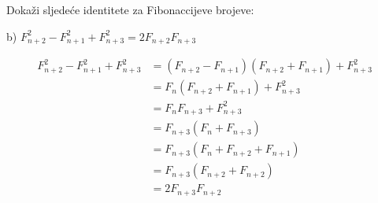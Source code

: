 \documentclass[exam.tex]{subfiles}
\begin{document}
	Dokaži sljedeće identitete za Fibonaccijeve brojeve:
	
	b) \( F^2_{n + 2} - F^2_{n + 1} + F^2_{n + 3} = 2 F_{n + 2} F_{n + 3} \)
	
	\begin{align*}
		F^2_{n + 2} - F^2_{n + 1} + F^2_{n + 3} &= (F_{n + 2} - F_{n + 1})(F_{n + 2} + F_{n + 1}) + F^2_{n + 3} \\
		&= F_n (F_{n + 2} + F_{n + 1}) + F^2_{n + 3} \\
		&= F_n F_{n + 3} + F^2_{n + 3} \\
		&= F_{n + 3} ( F_n + F_{n + 3} ) \\
		&= F_{n + 3} ( F_n + F_{n + 2} + F_{n + 1} ) \\
		&= F_{n + 3} ( F_{n + 2} + F_{n + 2} ) \\
		&= 2 F_{n + 3} F_{n + 2} 
	\end{align*}
\end{document}
